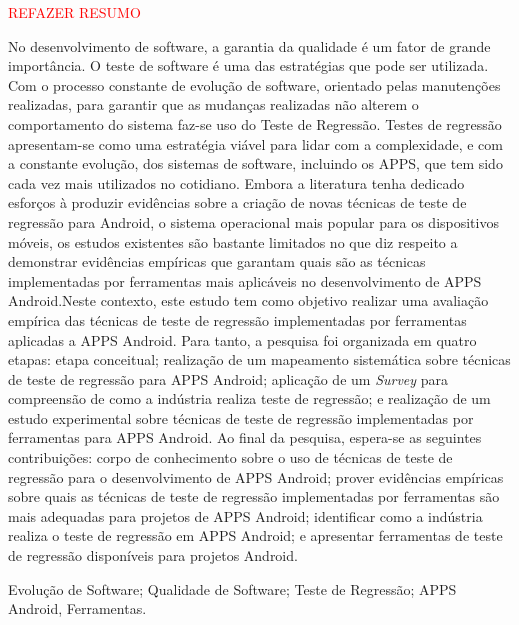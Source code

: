 
\resumo

\textcolor{red}{REFAZER RESUMO}


No desenvolvimento de software, a garantia da qualidade é um fator de grande importância. O teste de software é uma das estratégias que pode ser utilizada. Com o processo constante de evolução de software, orientado pelas manutenções realizadas, para garantir que as mudanças realizadas não alterem o comportamento do sistema faz-se uso do Teste de Regressão. Testes de regressão apresentam-se como uma estratégia viável para lidar com a complexidade, e com a constante evolução, dos sistemas de software, incluindo os \ac{APPS}, que tem sido cada vez mais utilizados no cotidiano. Embora a literatura tenha dedicado esforços à produzir evidências sobre a criação de novas técnicas de teste de regressão para Android,  o sistema operacional mais popular para os dispositivos móveis, os estudos existentes são bastante limitados no que diz respeito a demonstrar evidências empíricas que garantam quais são as técnicas implementadas por ferramentas mais aplicáveis no desenvolvimento de \ac{APPS} Android.Neste contexto, este estudo tem como objetivo realizar uma avaliação empírica das técnicas de teste de regressão implementadas por ferramentas aplicadas a \ac{APPS} Android. Para tanto, a pesquisa foi organizada em quatro etapas: etapa conceitual; realização de um mapeamento sistemática sobre técnicas de teste de regressão para \ac{APPS} Android; aplicação de um \textit{Survey} para compreensão de como a indústria realiza teste de regressão; e realização de um estudo experimental sobre técnicas de teste de regressão implementadas por ferramentas para \ac{APPS} Android. Ao final da pesquisa, espera-se as seguintes contribuições: corpo de conhecimento sobre o uso de técnicas de teste de regressão para o desenvolvimento de \ac {APPS} Android; prover evidências empíricas sobre quais as técnicas de teste de regressão implementadas por ferramentas são mais adequadas para projetos de \ac{APPS} Android; identificar como a indústria realiza o teste de regressão em \ac{APPS} Android; e apresentar ferramentas de teste de regressão disponíveis para projetos Android.



\begin{keywords}
Evolução de Software; Qualidade de Software; Teste de Regressão; APPS Android, Ferramentas.
\end{keywords}

